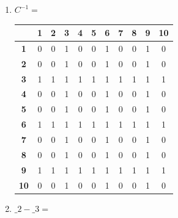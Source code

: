 \documentclass[a4paper,14pt]{extarticle}
\begin{document}
\begin{enumerate}[label=1.\arabic*.]
\begin{enumerate}[1) ]
		      \item $C^{-1} = $  \begin{tabular}{|c|c|c|c|c|c|c|c|c|c|c|}
			            \hline
			                              & \textbf{1} & \textbf{2} & \textbf{3} & \textbf{4} & \textbf{5} & \textbf{6} & \textbf{7} & \textbf{8} & \textbf{9} & \textbf{10} \\
			            \hline\textbf{1}  & 0          & 0          & 1          & 0          & 0          & 1          & 0          & 0          & 1          & 0           \\
			            \hline\textbf{2}  & 0          & 0          & 1          & 0          & 0          & 1          & 0          & 0          & 1          & 0           \\
			            \hline\textbf{3}  & 1          & 1          & 1          & 1          & 1          & 1          & 1          & 1          & 1          & 1           \\
			            \hline\textbf{4}  & 0          & 0          & 1          & 0          & 0          & 1          & 0          & 0          & 1          & 0           \\
			            \hline\textbf{5}  & 0          & 0          & 1          & 0          & 0          & 1          & 0          & 0          & 1          & 0           \\
			            \hline\textbf{6}  & 1          & 1          & 1          & 1          & 1          & 1          & 1          & 1          & 1          & 1           \\
			            \hline\textbf{7}  & 0          & 0          & 1          & 0          & 0          & 1          & 0          & 0          & 1          & 0           \\
			            \hline\textbf{8}  & 0          & 0          & 1          & 0          & 0          & 1          & 0          & 0          & 1          & 0           \\
			            \hline\textbf{9}  & 1          & 1          & 1          & 1          & 1          & 1          & 1          & 1          & 1          & 1           \\
			            \hline\textbf{10} & 0          & 0          & 1          & 0          & 0          & 1          & 0          & 0          & 1          & 0           \\
			            \hline
		            \end{tabular}
		      \item $\_2 - \_3 = $  \begin{tabular}{|c|c|c|c|c|c|c|c|c|c|c|}

\end{tabular}
\end{enumerate}
\end{enumerate}
\end{document}
